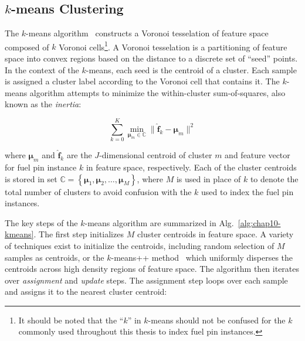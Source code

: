
\subsection{$k$-means Clustering}
\label{subsec:chap10-kmeans}

The $k$-means algorithm~\cite{macqueen1967kmeans, lloyd1982kmeans} constructs a Voronoi tesselation of feature space composed of $k$ Voronoi cells\footnote{It should be noted that the ``$k$'' in $k$-means should not be confused for the $k$ commonly used throughout this thesis to index fuel pin instances.}. A Voronoi tesselation is a partitioning of feature space into convex regions based on the distance to a discrete set of ``seed'' points. In the context of the $k$-means, each seed is the centroid of a cluster. Each sample is assigned a cluster label according to the Voronoi cell that contains it. The $k$-means algorithm attempts to minimize the within-cluster sum-of-squares, also known as the \textit{inertia}:

\begin{equation}
\label{eqn:chap10-kmeans-inertia}
\displaystyle\sum\limits_{k=0}^{K} \min_{\boldsymbol{\mu}_{m} \in \mathbb{C}} \|\boldsymbol{\hat{f}}_{k} - \boldsymbol{\mu}_{m}\|^{2}
\end{equation}

\noindent where $\boldsymbol{\mu}_{m}$ and $\boldsymbol{\hat{f}}_{k}$ are the $J$-dimensional centroid of cluster $m$ and feature vector for fuel pin instance $k$ in feature space, respectively. Each of the cluster centroids is stored in set $\mathbb{C} = \left\{ \boldsymbol{\mu}_{1}, \boldsymbol{\mu}_{2}, \dots, \boldsymbol{\mu}_{M} \right\}$, where $M$ is used in place of $k$ to denote the total number of clusters to avoid confusion with the $k$ used to index the fuel pin instances.

The key steps of the $k$-means algorithm are summarized in Alg.~\ref{alg:chap10-kmeans}. The first step initializes $M$ cluster centroids in feature space. A variety of techniques exist to initialize the centroids, including random selection of $M$ samples as centroids, or the $k$-means++ method~\cite{arthur2007kmeans++} which uniformly disperses the centroids across high density regions of feature space. The algorithm then iterates over \textit{assignment} and \textit{update} steps. The assignment step loops over each sample and assigns it to the nearest cluster centroid:

